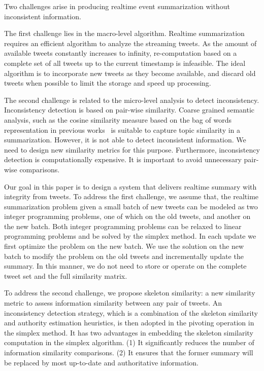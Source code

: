 \documentclass[runningheads]{llncs}
\begin{document}
Two challenges arise in producing realtime event summarization without inconsistent information.

The first challenge lies in the macro-level algorithm. Realtime summarization requires an efficient algorithm to analyze the streaming tweets. As the amount of available tweets constantly increases to infinity, re-computation based on a complete set of all tweets up to the current timestamp is infeasible. The ideal algorithm is to  incorporate new tweets as they become available, and discard old tweets when possible to limit the storage and speed up processing.

The second challenge is related to the micro-level analysis to detect inconsistency. Inconsistency detection is based on pair-wise similarity. Coarse grained semantic analysis, such as the cosine similarity measure based on the bag of words representation in previous works~\cite{Takamura2011Summarizing,Lin2012Generating,Rudra2015Extracting,Shou2013Sumblr,Liu2016LEDS,Gillani2017Post,Zubiaga2012Towards,Sharifi2010Summarizing} is suitable to capture topic similarity in a summarization. However, it is not able to detect inconsistent information. We need to design new similarity metrics for this purpose. Furthermore, inconsistency detection is computationally expensive. It is important to avoid unnecessary pair-wise comparisons.

Our goal in this paper is to design a system that delivers realtime summary with integrity from tweets. To address the first challenge, we assume that, the realtime summarization problem given a small batch of new tweets can be modeled as two integer programming problems, one of which on the old tweets, and another on the new batch. Both integer programming problems can be relaxed to linear programming problems and be solved by the simplex method. In each update we first optimize the problem on the new batch. We use the solution on the new batch to modify the problem on the old tweets and incrementally update the summary.  In this manner, we do not need to store or operate on the complete tweet set and the full similarity matrix.

To address the second challenge, we propose skeleton similarity: a new similarity metric to assess information similarity between any pair of tweets. An inconsistency detection strategy, which is a combination of the skeleton similarity and authority estimation heuristics, is then adopted in the pivoting operation in the simplex method. It has two advantages in embedding the skeleton similarity computation in the simplex algorithm. (1) It significantly reduces the number of information similarity comparisons. (2) It ensures that the former summary will be replaced by most up-to-date and authoritative information.
\end{document}
